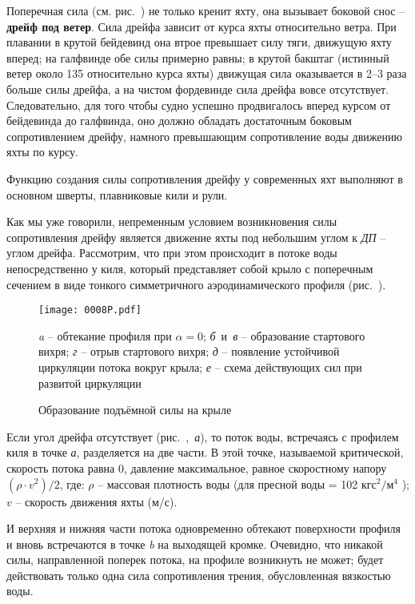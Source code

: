 Поперечная сила  (см. рис.~)
не только кренит яхту, она вызывает боковой снос \---
\textbf{дрейф под ветер}. Сила дрейфа зависит от курса яхты
относительно ветра. При плавании в крутой бейдевинд она втрое
превышает силу тяги, движущую яхту вперед; на галфвинде обе силы
примерно равны; в крутой бакштаг (истинный ветер около 135\gr
относительно курса яхты) движущая сила оказывается в 2--3 раза больше
силы дрейфа, а на чистом фордевинде сила дрейфа вовсе
отсутствует. Следовательно, для того чтобы судно успешно продвигалось
вперед курсом от бейдевинда до галфвинда, оно должно обладать
достаточным боковым сопротивлением дрейфу, намного превышающим
сопротивление воды движению яхты по курсу.

Функцию создания силы сопротивления дрейфу
у современных яхт выполняют в основном шверты, плавниковые кили и рули.

Как мы уже говорили, непременным условием возникновения силы
сопротивления дрейфу является движение яхты под небольшим углом к
\textit{ДП} \--- углом дрейфа. Рассмотрим, что при этом происходит в
потоке воды непосредственно у киля, который представляет собой крыло с
поперечным сечением в виде тонкого симметричного аэродинамического
профиля (рис.~).

\begin{figure*}[htb]
  \centering
  \texttt{[image: 0008P.pdf]}
  \caption{Образование подъёмной силы на крыле}
  \label{fig:8}
  \centering{}\small \textit{a} \--- обтекание профиля при $\alpha = 0$;
                     \textit{б}~и~\textit{в} \--- образование стартового вихря;
                     \textit{г} \--- отрыв стартового вихря;
                     \textit{д} \--- появление устойчивой циркуляции потока вокруг крыла;
                     \textit{е} \--- схема действующих сил при развитой циркуляции
\end{figure*}

Если угол дрейфа отсутствует (рис.~,~\textit{а}), то поток
воды, встречаясь с профилем киля в точке \textit{а}, разделяется на
две части. В этой точке, называемой критической, скорость потока равна
0, давление максимальное, равное скоростному напору
$(\rho \cdot v^2) / 2$, где: $\rho$ \--- массовая плотность воды (для
пресной воды = 102 $\text{кгс}^2 / \text{м}^4$ ); $v$ \--- скорость
движения яхты (м/с).

И верхняя и нижняя части потока одновременно обтекают поверхности
профиля и вновь встречаются в точке \textit{b} на выходящей
кромке. Очевидно, что никакой силы, направленной поперек потока, на
профиле возникнуть не может; будет действовать только одна сила
сопротивления трения, обусловленная вязкостью воды.

